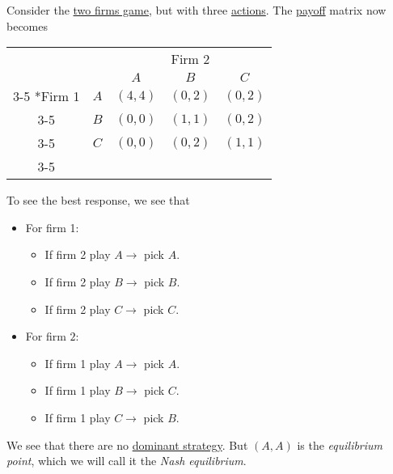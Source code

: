 \begin{eg}\label{eg:two-firms-ver2}
	Consider the \hyperref[eg:two-firms]{two firms game}, but with three \hyperref[def:strategy]{actions}. The \hyperref[def:reward]{payoff} matrix now becomes
	\begin{table}[H]
		\centering
		\setlength{\extrarowheight}{2pt}
		\begin{tabular}{cc|c|c|c|}
			                      & \multicolumn{1}{c}{} & \multicolumn{3}{c}{Firm 2}                                                     \\
			                      & \multicolumn{1}{c}{} & \multicolumn{1}{c}{$A$}    & \multicolumn{1}{c}{$B$} & \multicolumn{1}{c}{$C$} \\\cline{3-5}
			\multirow{3}*{Firm 1} & $A$                  & $(4, 4)$                   & $(0, 2)$                & $(0, 2)$                \\\cline{3-5}
			                      & $B$                  & $(0, 0)$                   & $(1, 1)$                & $(0, 2)$                \\\cline{3-5}
			                      & $C$                  & $(0, 0)$                   & $(0, 2)$                & $(1, 1)$                \\\cline{3-5}
		\end{tabular}
	\end{table}

	To see the best response, we see that
	\begin{itemize}
		\item For firm 1:
		      \begin{itemize}
			      \item If firm 2 play \(A\to \) pick \(A\).
			      \item If firm 2 play \(B\to \) pick \(B\).
			      \item If firm 2 play \(C\to \) pick \(C\).
		      \end{itemize}
		\item For firm \(2\):
		      \begin{itemize}
			      \item If firm 1 play \(A\to \) pick \(A\).
			      \item If firm 1 play \(B\to \) pick \(C\).
			      \item If firm 1 play \(C\to \) pick \(B\).
		      \end{itemize}
	\end{itemize}
	We see that there are no \hyperref[def:dominant-strategy]{dominant strategy}. But \((A, A)\) is the \emph{equilibrium point}, which we will call it the \emph{Nash equilibrium}.
\end{eg}

